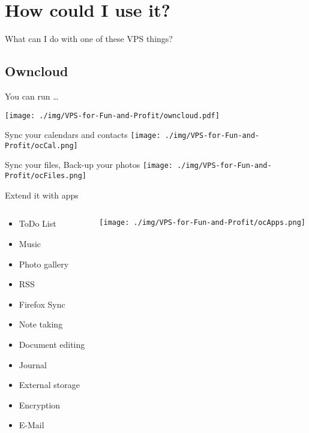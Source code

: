 \documentclass[presentation,aspectratio=169]{beamer}
\begin{document}
\section{How could I use it?}
\label{sec-4}
\begin{frame}[label=sec-4-0-1]{What can I do with one of these VPS things?}
\end{frame}
\subsection{Owncloud}
\label{sec-4-1}
\begin{frame}[label=sec-4-1-1]{You can run \ldots{}}
\begin{center}
\texttt{[image: ./img/VPS-for-Fun-and-Profit/owncloud.pdf]}
\end{center}
\end{frame}
\begin{frame}[label=sec-4-1-2]{Sync your calendars and contacts}
\texttt{[image: ./img/VPS-for-Fun-and-Profit/ocCal.png]}
\end{frame}
\begin{frame}[label=sec-4-1-3]{Sync your files, Back-up your photos}
\texttt{[image: ./img/VPS-for-Fun-and-Profit/ocFiles.png]}
\end{frame}
\begin{frame}[label=sec-4-1-4]{Extend it with apps}
\begin{columns}
\begin{column}{0.3\textwidth}

\begin{itemize}
\item ToDo List
\item Music
\item Photo gallery
\item RSS
\item Firefox Sync
\item Note taking
\item Document editing
\item Journal
\item External storage
\item Encryption
\item E-Mail
\end{itemize}
\end{column}

\begin{column}{0.65\textwidth}

\texttt{[image: ./img/VPS-for-Fun-and-Profit/ocApps.png]}
\end{column}
\end{columns}
\end{frame}
\end{document}
